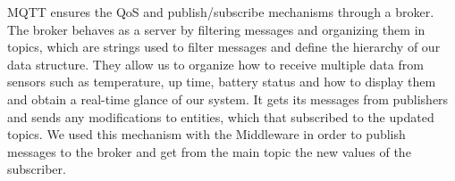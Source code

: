 MQTT ensures the QoS and publish/subscribe mechanisms through a broker.
The broker behaves as a server by filtering messages and organizing them in topics,
	which are strings used to filter messages and define the hierarchy of our data structure.
They allow us to organize how to receive multiple data from sensors such as temperature,
	up time,
	battery status and how to display them and obtain a real-time glance of our system.
It gets its messages from publishers and sends any modifications to entities,
	which that subscribed to the updated topics.
We used this mechanism with the Middleware in order to publish messages to the broker and get from the main topic the new values of the subscriber.






